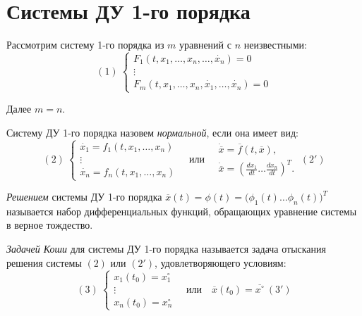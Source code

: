 \chapter{Системы ДУ 1-го порядка}



Рассмотрим систему 1-го порядка из $m$ уравнений с $n$ неизвестными:
\[
	(1) \ \left\{\begin{array}{l}
		F_1(t,x_1,\ldots ,x_n,\ldots ,\dot{x_n}) = 0 \\
		\vdots                                       \\
		F_m(t,x_1,\ldots ,x_n,\dot{x_1},\ldots ,\dot{x_n}) = 0
	\end{array}\right.
\]

Далее $m = n$.

\begin{definition}
	Систему ДУ 1-го порядка назовем \emph{нормальной}, если она имеет вид:
	\[
		(2) \ \left\{\begin{array}{l}
			\dot{x_1} = f_1(t,x_1,\ldots ,x_n) \\
			\vdots                             \\
			\dot{x_n} = f_n(t,x_1,\ldots ,x_n)
		\end{array}\right. \quad \text{или} \quad \begin{array}{l}
			\dot{\overline{x} } = \overline{f} (t,\overline{x} ), \\
			\dot{\overline{x} } = \left(\frac{d x_1}{d t} \ldots \frac{d x_n}{d t} \right)^T.
		\end{array} \ (2 ')
	\]
\end{definition}

\begin{definition}
	\emph{Решением} системы ДУ 1-го порядка $\overline{x} (t) = \phi (t) = \big(\phi _1(t)\ldots \phi _n (t)\big)^T$ называется набор дифференциальных функций, обращающих уравнение системы в верное тождество.
\end{definition}

\begin{definition}
	\emph{Задачей Коши} для системы ДУ 1-го порядка называется задача отыскания решения системы $(2)$ или $(2 ')$, удовлетворяющего условиям:
	\[
		(3) \ \left\{\begin{array}{l}
			x_1(t_0) = x_{1}^{\circ} \\
			\vdots                   \\
			x_n(t_0) = x_{n}^{\circ}
		\end{array}\right. \quad \text{или} \quad \overline{x} (t_0) = \overline{x^{\circ}  } \ (3 ')
	\]
\end{definition}

